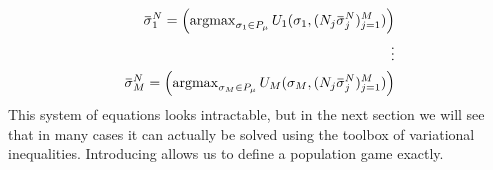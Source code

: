 \begin{equation}
  \label{eq:tot_nash_eq}
  \begin{split}
    \overbar{\sigma}_1^N = \pa{\argmax_{\sigma_1 \in P_{\mu}} U_1(\sigma_1, (N_j \overbar{\sigma}^N_j)_{j=1}^M) } \\
    \vdots \\
    \overbar{\sigma}_M^N = \pa{\argmax_{\sigma_M \in P_{\mu}} U_M(\sigma_M, (N_j \overbar{\sigma}^N_j)_{j=1}^M) }
    \end{split}
\end{equation}
This system of equations looks intractable, but in the next section we will see that in many cases it can actually be solved using the toolbox of variational inequalities. Introducing  allows us to define a population game exactly.
